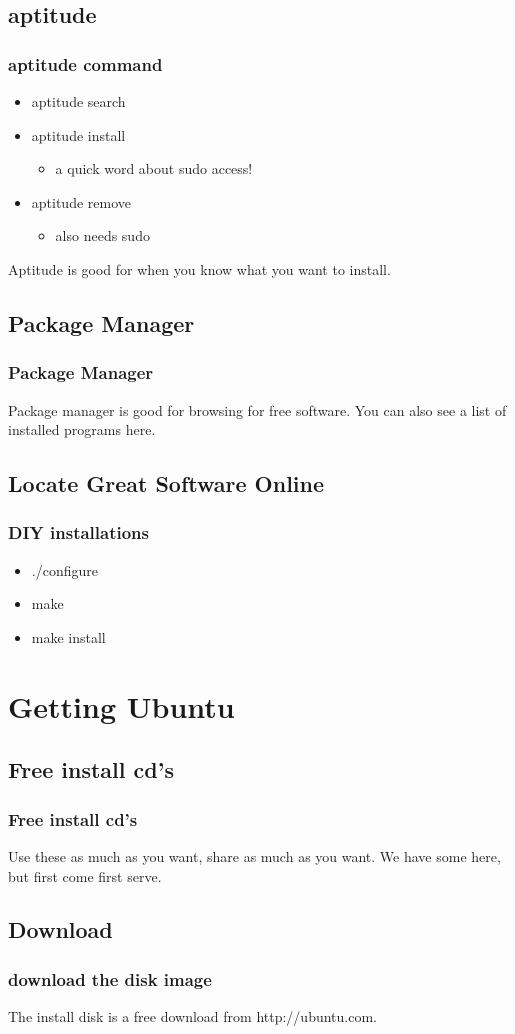 \documentclass[hyperref={pdfpagelabels=false}]{beamer}
\begin{document}
\subsection{aptitude}
\frame
{
	\frametitle{aptitude command}
	\begin{itemize}
	\item{aptitude search}
	\item{aptitude install}
		\begin{itemize}
		\item{a quick word about sudo access!}
		\end{itemize}
	\item{aptitude remove}
		\begin{itemize}
		\item{also needs sudo}
		\end{itemize}
	\end{itemize}
	Aptitude is good for when you know what you want to install.	
	
}
\subsection{Package Manager}
\frame
{
	\frametitle{Package Manager}
	Package manager is good for browsing for free software.
	You can also see a list of installed programs here.

}
\subsection{Locate Great Software Online}
\frame
{	
	\frametitle{DIY installations}
	\begin{itemize}
	\item{./configure}
	\item{make}
	\item{make install}
	\end{itemize}

}
\section{Getting Ubuntu}
\subsection{Free install cd's}
\frame
{
    \frametitle{Free install cd's}
    Use these as much as you want, share as much as you want. We have some here, but first come first serve.
}
\subsection{Download}
\frame
{
    \frametitle{download the disk image}
    The install disk is a free download from http://ubuntu.com.
}
\end{document}
